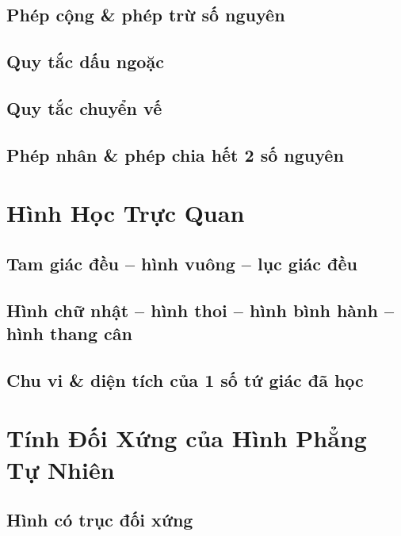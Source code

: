 \documentclass{article}
\numberwithin{equation}{section}
\begin{document}
\subsection{Phép cộng \& phép trừ số nguyên}

\subsection{Quy tắc dấu ngoặc}

\subsection{Quy tắc chuyển vế}

\subsection{Phép nhân \& phép chia hết 2 số nguyên}


\newpage
\section{Hình Học Trực Quan}

\subsection{Tam giác đều -- hình vuông -- lục giác đều}

\subsection{Hình chữ nhật -- hình thoi -- hình bình hành -- hình thang cân}

\subsection{Chu vi \& diện tích của 1 số tứ giác đã học}


\section{Tính Đối Xứng của Hình Phẳng Tự Nhiên}

\subsection{Hình có trục đối xứng}
\end{document}
